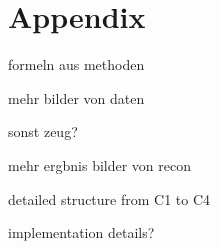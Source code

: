 \chapter{Appendix}
\label{sec:appendix}
formeln aus methoden

mehr bilder von daten

sonst zeug?

mehr ergbnis bilder von recon

detailed structure from C1 to C4

implementation details?